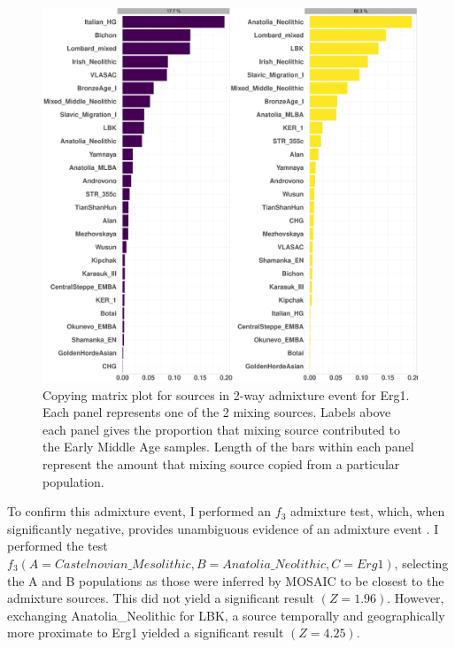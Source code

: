 \begin{figure}[htp]
    \centering
    \includegraphics[width=1.0\textwidth]{../images/chapter4/Erg1_MU_matrix.pdf}
    \caption{Copying matrix plot for sources in 2-way admixture event for Erg1. Each panel represents one of the 2 mixing sources. Labels above each panel gives the proportion that mixing source contributed to the Early Middle Age samples. Length of the bars within each panel represent the amount that mixing source copied from a particular population.}
    \label{fig:Erg1_MU_matrix}
\end{figure}

To confirm this admixture event, I performed an $f_{3}$ admixture test, which, when significantly negative, provides unambiguous evidence of an admixture event \cite{Patterson2012}. I performed the test $f_{3}(A=Castelnovian\_Mesolithic, B=Anatolia\_Neolithic, C=Erg1)$, selecting the A and B populations as those were inferred by MOSAIC to be closest to the admixture sources. This did not yield a significant result $(Z=1.96)$. However, exchanging Anatolia\_Neolithic for LBK, a source temporally and geographically more proximate to Erg1 yielded a significant result $(Z=4.25)$. 

